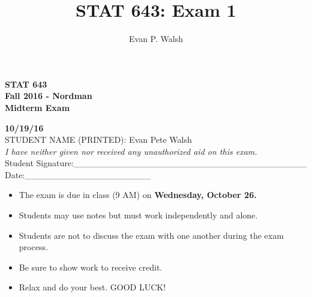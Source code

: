 \documentclass[12pt]{article}
\title{STAT 643: Exam 1}
\author{Evan P. Walsh}
\begin{document}
\vspace*{3cm}
\begin{center}{\Large


\bf STAT 643  \\   Fall 2016 - Nordman \\
\vspace{.2cm}  Midterm Exam \\}
\vspace{.2cm} {\large {\bf 10/19/16}  \\
  \vspace{2cm} STUDENT NAME (PRINTED): Evan Pete Walsh \\
\vspace{1.5cm} {\em I have neither given nor received any unauthorized aid on this exam.}\\
\vspace{1cm} Student
Signature:\_\_\_\_\_\_\_\_\_\_\_\_\_\_\_\_\_\_\_\_\_\_\_\_\_\_\_\_\_\_\_\_\_\_\_\_\_ Date:\_\_\_\_\_\_\_\_\_\_\_\_\_\_\_\_\_\_\_\_
}
\end{center}

\vspace*{2cm}
\begin{center}{\large

\begin{itemize}
\item The exam is due in class (9 AM) on \textbf{Wednesday, October 26.}
\item Students may use notes but must work independently and alone.
 \item Students are not to discuss the exam with one another during the exam process.
\item Be sure to show work to receive  credit.
\item Relax and do your best.  GOOD LUCK!
\end{itemize}



 }
\end{center}
\newpage
\end{document}
